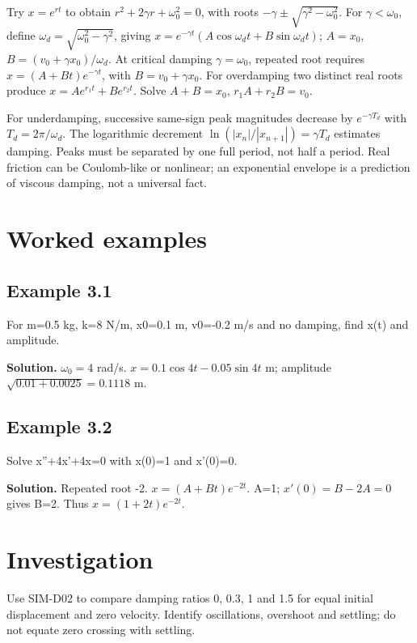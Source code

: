 \documentclass[11pt,a4paper,openany]{book}
\begin{document}
Try $x=e^{rt}$ to obtain $r^2+2\gamma r+\omega_0^2=0$, with roots $-\gamma\pm\sqrt{\gamma^2-\omega_0^2}$. For $\gamma<\omega_0$, define $\omega_d=\sqrt{\omega_0^2-\gamma^2}$, giving $x=e^{-\gamma t}(A\cos\omega_dt+B\sin\omega_dt)$; $A=x_0$, $B=(v_0+\gamma x_0)/\omega_d$. At critical damping $\gamma=\omega_0$, repeated root requires $x=(A+Bt)e^{-\gamma t}$, with $B=v_0+\gamma x_0$. For overdamping two distinct real roots produce $x=Ae^{r_1t}+Be^{r_2t}$. Solve $A+B=x_0$, $r_1A+r_2B=v_0$.

For underdamping, successive same-sign peak magnitudes decrease by $e^{-\gamma T_d}$ with $T_d=2\pi/\omega_d$. The logarithmic decrement $\ln(|x_n|/|x_{n+1}|)=\gamma T_d$ estimates damping. Peaks must be separated by one full period, not half a period. Real friction can be Coulomb-like or nonlinear; an exponential envelope is a prediction of viscous damping, not a universal fact.
\begin{center}
\end{center}
\section{Worked examples}
\subsection*{Example 3.1}
For m=0.5 kg, k=8 N/m, x0=0.1 m, v0=-0.2 m/s and no damping, find x(t) and amplitude.

\textbf{Solution.} $\omega_0=4$ rad/s. $x=0.1\cos4t-0.05\sin4t$ m; amplitude $\sqrt{0.01+0.0025}=0.1118$ m.
\subsection*{Example 3.2}
Solve x''+4x'+4x=0 with x(0)=1 and x'(0)=0.

\textbf{Solution.} Repeated root -2. $x=(A+Bt)e^{-2t}$. A=1; $x'(0)=B-2A=0$ gives B=2. Thus $x=(1+2t)e^{-2t}$.
\section{Investigation}
Use SIM-D02 to compare damping ratios 0, 0.3, 1 and 1.5 for equal initial displacement and zero velocity. Identify oscillations, overshoot and settling; do not equate zero crossing with settling.
\end{document}
